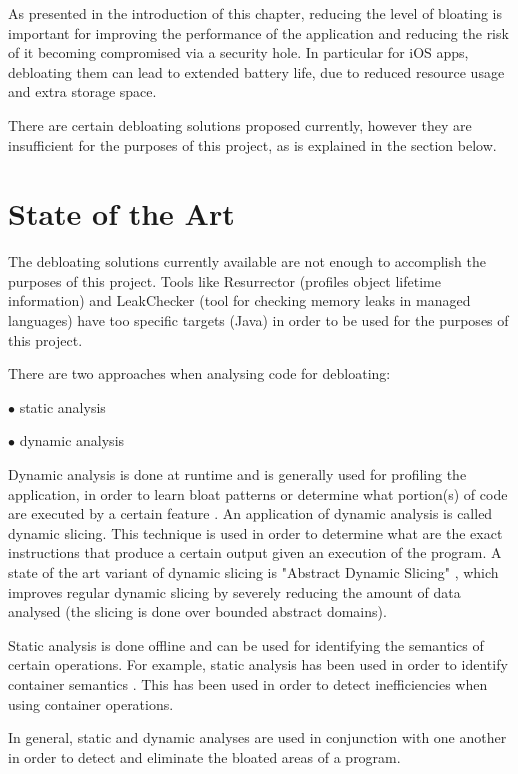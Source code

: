 As presented in the introduction of this chapter, reducing the level of bloating
is important for improving the performance of the application and reducing the
risk of it becoming compromised via a security hole. In particular for iOS apps,
debloating them can lead to extended battery life, due to reduced resource usage 
and extra storage space.

There are certain debloating solutions proposed currently, however they are insufficient
for the purposes of this project, as is explained in the section below.

\section{State of the Art}
The debloating solutions currently available are not enough to accomplish the
purposes of this project. Tools like Resurrector \cite{resurrector} (profiles
object lifetime information) and LeakChecker \cite{leak_checker} (tool for checking
memory leaks in managed languages) have too specific targets (Java) in order
to be used for the purposes of this project.

There are two approaches when analysing code for debloating:
\begin{compactitem}
	\item[$\bullet$] static analysis
	\item[$\bullet$] dynamic analysis
\end{compactitem}

Dynamic analysis is done at runtime and is generally used for profiling the application,
in order to learn bloat patterns or determine what portion(s) of code are executed
by a certain feature \cite{bloating_article}. An application of dynamic analysis
is called dynamic slicing. This technique is used in order to determine what are the exact
instructions that produce a certain output given an execution of the program.
A state of the art variant of dynamic slicing is "Abstract Dynamic Slicing" \cite{dynamic_slicing},
which improves regular dynamic slicing by severely reducing the amount of data analysed
(the slicing is done over bounded abstract domains).

Static analysis is done offline and can be used for identifying the semantics of certain
operations. For example, static analysis has been used in order to identify container semantics
 \cite{container}. This has been used in order to detect inefficiencies when using container
operations.

In general, static and dynamic analyses are used in conjunction with one another in order
to detect and eliminate the bloated areas of a program.

